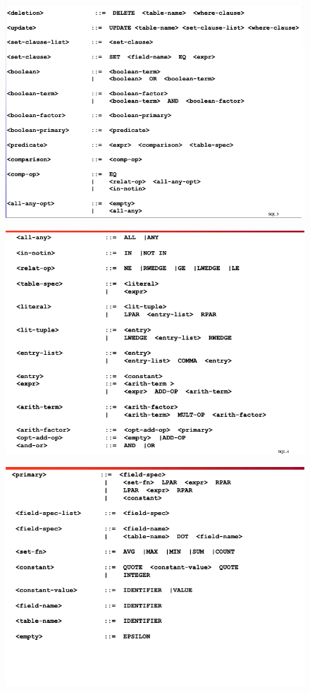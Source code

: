 \documentclass[
	12pt, %
]{fphw}
\begin{document}
\begin{figure}[H]
  \centering
  \includegraphics[scale=0.7]{images/bnf3.png}
\end{figure}
\begin{figure}[H]
  \centering
  \includegraphics[scale=0.7]{images/bnf4.png}
\end{figure}
\begin{figure}[H]
  \centering
  \includegraphics[scale=0.7]{images/bnf5.png}
\end{figure}
\end{document}
